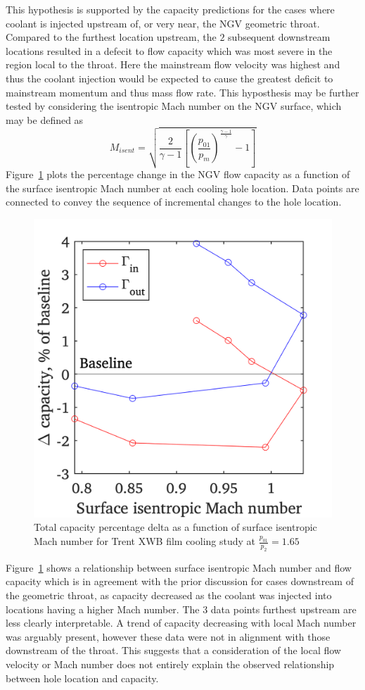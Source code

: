 \documentclass[a4paper, 11pt, oneside]{report}
\begin{document}
This hypothesis is supported by the capacity predictions for the cases where coolant is injected upstream of, or very near, the NGV geometric throat. Compared to the furthest location upstream, the $2$ subsequent downstream locations resulted in a defecit to flow capacity which was most severe in the region local to the throat. Here the mainstream flow velocity was highest and thus the coolant injection would be expected to cause the greatest deficit to mainstream momentum and thus mass flow rate. This hyposthesis may be further tested by considering the isentropic Mach number on the NGV surface, which may be defined as
\begin{equation}
M_{isent} =
\sqrt{
	\frac{2}{\gamma-1}
	\left[
		\left(
			\frac{p_{01}}{p_m}
		\right)
		^{\frac{\gamma-1}{\gamma}}
		-1
	\right]
}
\end{equation}
Figure~\ref{fig:sch_surface_isentropic_mach_number_vs_capacity} plots the percentage change in the NGV flow capacity as a function of the surface isentropic Mach number at each cooling hole location. Data points are connected to convey the sequence of incremental changes to the hole location.

\begin{figure}[H]
      \centering
      \includegraphics[width=.45\textwidth]{figs/sch_surface_isentropic_mach_number_vs_capacity.png}
      \caption{Total capacity percentage delta as a function of surface isentropic Mach number for Trent XWB film cooling study at $\frac{p_{01}}{p_2}=1.65$}
      \label{fig:sch_surface_isentropic_mach_number_vs_capacity}
\end{figure}

Figure~\ref{fig:sch_surface_isentropic_mach_number_vs_capacity} shows a relationship between surface isentropic Mach number and flow capacity which is in agreement with the prior discussion for cases downstream of the geometric throat, as capacity decreased as the coolant was injected into locations having a higher Mach number. The 3 data points furthest upstream are less clearly interpretable. A trend of capacity decreasing with local Mach number was arguably present, however these data were not in alignment with those downstream of the throat. This suggests that a consideration of the local flow velocity or Mach number does not entirely explain the observed relationship between hole location and capacity.
\end{document}
